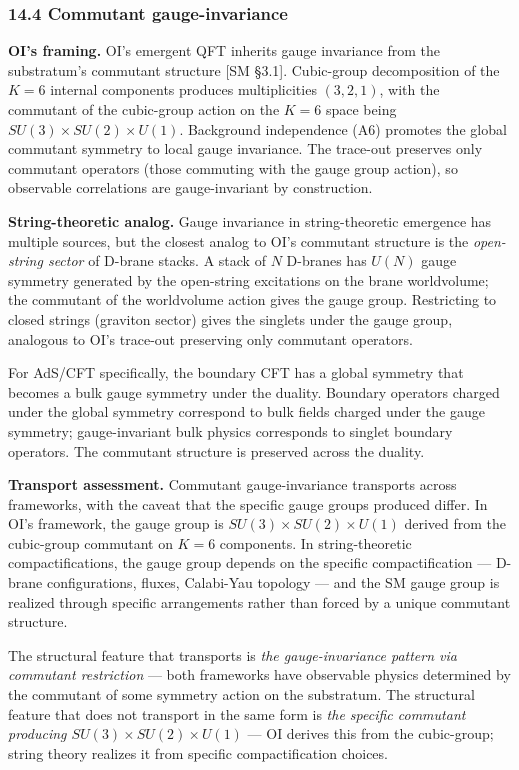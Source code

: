 \documentclass[
]{article}
\begin{document}
\hypertarget{commutant-gauge-invariance}{%
\subsubsection{14.4 Commutant
gauge-invariance}\label{commutant-gauge-invariance}}

\textbf{OI's framing.} OI's emergent QFT inherits gauge invariance from
the substratum's commutant structure {[}SM §3.1{]}. Cubic-group
decomposition of the \(K = 6\) internal components produces
multiplicities \((3, 2, 1)\), with the commutant of the cubic-group
action on the \(K = 6\) space being \(SU(3) \times SU(2) \times U(1)\).
Background independence (A6) promotes the global commutant symmetry to
local gauge invariance. The trace-out preserves only commutant operators
(those commuting with the gauge group action), so observable
correlations are gauge-invariant by construction.

\textbf{String-theoretic analog.} Gauge invariance in string-theoretic
emergence has multiple sources, but the closest analog to OI's commutant
structure is the \emph{open-string sector} of D-brane stacks. A stack of
\(N\) D-branes has \(U(N)\) gauge symmetry generated by the open-string
excitations on the brane worldvolume; the commutant of the worldvolume
action gives the gauge group. Restricting to closed strings (graviton
sector) gives the singlets under the gauge group, analogous to OI's
trace-out preserving only commutant operators.

For AdS/CFT specifically, the boundary CFT has a global symmetry that
becomes a bulk gauge symmetry under the duality. Boundary operators
charged under the global symmetry correspond to bulk fields charged
under the gauge symmetry; gauge-invariant bulk physics corresponds to
singlet boundary operators. The commutant structure is preserved across
the duality.

\textbf{Transport assessment.} Commutant gauge-invariance transports
across frameworks, with the caveat that the specific gauge groups
produced differ. In OI's framework, the gauge group is
\(SU(3) \times SU(2) \times U(1)\) derived from the cubic-group
commutant on \(K = 6\) components. In string-theoretic
compactifications, the gauge group depends on the specific
compactification --- D-brane configurations, fluxes, Calabi-Yau topology
--- and the SM gauge group is realized through specific arrangements
rather than forced by a unique commutant structure.

The structural feature that transports is \emph{the gauge-invariance
pattern via commutant restriction} --- both frameworks have observable
physics determined by the commutant of some symmetry action on the
substratum. The structural feature that does not transport in the same
form is \emph{the specific commutant producing
\(SU(3) \times SU(2) \times U(1)\)} --- OI derives this from the
cubic-group; string theory realizes it from specific compactification
choices.
\end{document}
